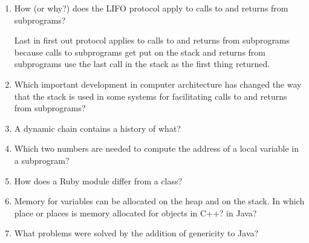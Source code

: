 \begin{enumerate}
  \item How (or why?) does the LIFO protocol apply to
    calls to and returns from subprograms?

  \begin{answer}
    Last in first out protocol applies to calls to and returns from subprograms because calls to subprograms get put on the stack and returns from subprograms use the last call in the stack as the first thing returned. 
  \end{answer}

  \item Which important development in computer architecture
    has changed the way that the stack is used in some
    systems for facilitating calls to and returns from
    subprograms?

  \begin{answer}

  \end{answer}

  \item A dynamic chain contains a history of what?

  \begin{answer}
  \end{answer}

  \item Which two numbers are needed to compute
    the address of a local variable in a subprogram?

  \begin{answer}
  \end{answer}

  \item How does a Ruby module differ from a class?

  \begin{answer}
  \end{answer}

  \item Memory for variables can be allocated on the heap
    and on the stack. In which place or places is memory
    allocated for objects in C++? in Java?

  \begin{answer}
  \end{answer}

  \item What problems were solved by the addition
    of genericity to Java?

  \begin{answer}
  \end{answer}


\end{enumerate}
